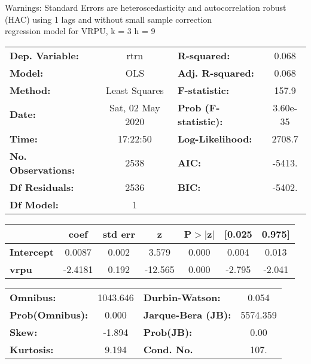 Warnings: \newline
 [1] Standard Errors are heteroscedasticity and autocorrelation robust (HAC) using 1 lags and without small sample correction\\ 

regression model for VRPU, k = 3 h = 9\begin{center}
\begin{tabular}{lclc}
\toprule
\textbf{Dep. Variable:}    &       rtrn       & \textbf{  R-squared:         } &     0.068   \\
\textbf{Model:}            &       OLS        & \textbf{  Adj. R-squared:    } &     0.068   \\
\textbf{Method:}           &  Least Squares   & \textbf{  F-statistic:       } &     157.9   \\
\textbf{Date:}             & Sat, 02 May 2020 & \textbf{  Prob (F-statistic):} &  3.60e-35   \\
\textbf{Time:}             &     17:22:50     & \textbf{  Log-Likelihood:    } &    2708.7   \\
\textbf{No. Observations:} &        2538      & \textbf{  AIC:               } &    -5413.   \\
\textbf{Df Residuals:}     &        2536      & \textbf{  BIC:               } &    -5402.   \\
\textbf{Df Model:}         &           1      & \textbf{                     } &             \\
\bottomrule
\end{tabular}
\begin{tabular}{lcccccc}
                   & \textbf{coef} & \textbf{std err} & \textbf{z} & \textbf{P$> |$z$|$} & \textbf{[0.025} & \textbf{0.975]}  \\
\midrule
\textbf{Intercept} &       0.0087  &        0.002     &     3.579  &         0.000        &        0.004    &        0.013     \\
\textbf{vrpu}      &      -2.4181  &        0.192     &   -12.565  &         0.000        &       -2.795    &       -2.041     \\
\bottomrule
\end{tabular}
\begin{tabular}{lclc}
\textbf{Omnibus:}       & 1043.646 & \textbf{  Durbin-Watson:     } &    0.054  \\
\textbf{Prob(Omnibus):} &   0.000  & \textbf{  Jarque-Bera (JB):  } & 5574.359  \\
\textbf{Skew:}          &  -1.894  & \textbf{  Prob(JB):          } &     0.00  \\
\textbf{Kurtosis:}      &   9.194  & \textbf{  Cond. No.          } &     107.  \\
\bottomrule
\end{tabular}
\end{center}

